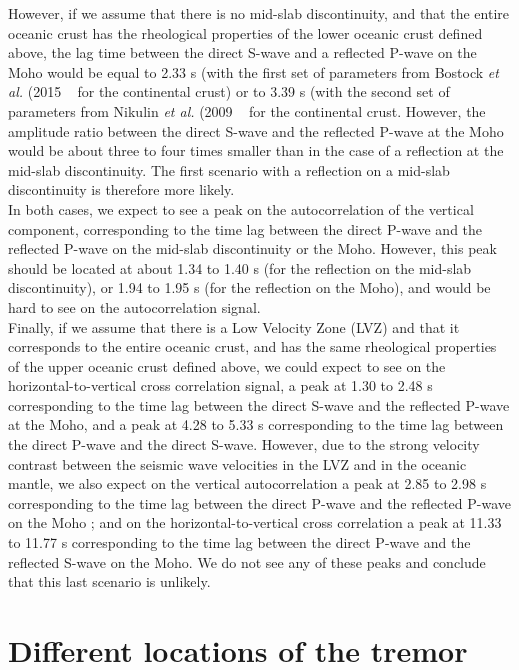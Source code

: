 \documentclass[workdone.tex]{subfiles}
\begin{document}
However, if we assume that there is no mid-slab discontinuity, and that the entire oceanic crust has the rheological properties of the lower oceanic crust defined above, the lag time between the direct S-wave and a reflected P-wave on the Moho would be equal to 2.33 s (with the first set of parameters from Bostock \textit{et al.} (2015 ~\cite{BOS_2015} for the continental crust) or to 3.39 s (with the second set of parameters from Nikulin \textit{et al.} (2009 ~\cite{NIK_2009} for the continental crust. However, the amplitude ratio between the direct S-wave and the reflected P-wave at the Moho would be about three to four times smaller than in the case of a reflection at the mid-slab discontinuity. The first scenario with a reflection on a mid-slab discontinuity is therefore more likely. \\

In both cases, we expect to see a peak on the autocorrelation of the vertical component, corresponding to the time lag between the direct P-wave and the reflected P-wave on the mid-slab discontinuity or the Moho. However, this peak should be located at about 1.34 to 1.40 s (for the reflection on the mid-slab discontinuity), or 1.94 to 1.95 s (for the reflection on the Moho), and would be hard to see on the autocorrelation signal. \\

Finally, if we assume that there is a Low Velocity Zone (LVZ) and that it corresponds to the entire oceanic crust, and has the same rheological properties of the upper oceanic crust defined above, we could expect to see on the horizontal-to-vertical cross correlation signal, a peak at 1.30 to 2.48 s corresponding to the time lag between the direct S-wave and the reflected P-wave at the Moho, and a peak at 4.28 to 5.33 s corresponding to the time lag between the direct P-wave and the direct S-wave. However, due to the strong velocity contrast between the seismic wave velocities in the LVZ and in the oceanic mantle, we also expect on the vertical autocorrelation a peak at 2.85 to 2.98 s corresponding to the time lag between the direct P-wave and the reflected P-wave on the Moho ; and on the horizontal-to-vertical cross correlation a peak at 11.33 to 11.77 s corresponding to the time lag between the direct P-wave and the reflected S-wave on the Moho. We do not see any of these peaks and conclude that this last scenario is unlikely.

\section{Different locations of the tremor}
\end{document}
